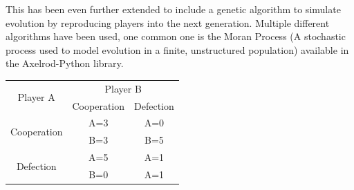 \documentclass[twoside,twocolumn]{article}
\begin{document}
This has been even further extended to include a genetic algorithm to simulate evolution by reproducing players into the next generation. Multiple different algorithms have been used, one common one is the Moran Process (A stochastic process used to model evolution in a finite, unstructured population) available in the Axelrod-Python library. 
\begin{framed}
	\begin{center}
		\begin{tabular}{c|c|c}
		\multirow{2}{*}{Player A} & \multicolumn{2}{c}{Player B}\\		
		& Cooperation & Defection\\
		\hline
		\multirow{2}{*}{Cooperation} & A=3 & A=0\\
		& B=3 & B=5\\
		\hline
		\multirow{2}{*}{Defection} & A=5 & A=1\\
		& B=0 & A=1\\
		\end{tabular}
		\label{tab:payoffmatrix}
	\end{center}	
\end{framed}
\end{document}
